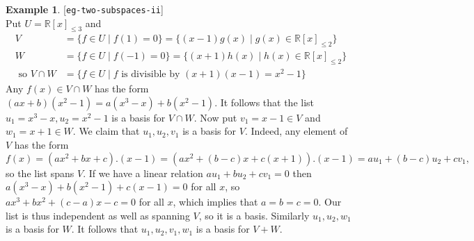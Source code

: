 \documentclass{amsart}
\newcommand{\lbl}[1]{\label{#1}\textup{[\texttt{#1}]}\ \\}
\newcommand{\lbl}{\label}
\newcommand{\R}         {{\mathbb{R}}}
\newcommand{\st}        {\;|\;}
\renewcommand{\:}       {\colon}
\theoremstyle{definition}
\newtheorem{example}[theorem]{Example}
\begin{document}
\begin{example}\lbl{eg-two-subspaces-ii}
 Put $U=\R[x]_{\leq 3}$ and 
 \begin{align*}
  V &= \{f\in U\st f(1)=0\} 
     = \{(x-1)g(x)\st g(x)\in \R[x]_{\leq 2}\} \\
  W &= \{f\in U\st f(-1)=0\} 
     = \{(x+1)h(x)\st h(x)\in \R[x]_{\leq 2}\} \\
  \text{ so } 
  V\cap W &=
    \{f\in U\st f \text{ is divisible by } (x+1)(x-1)=x^2-1\}
 \end{align*}
 Any $f(x)\in V\cap W$ has the form
 $(ax+b)(x^2-1)=a(x^3-x)+b(x^2-1)$.  It follows that the
 list $u_1=x^3-x,u_2=x^2-1$ is a basis for $V\cap W$.  Now
 put $v_1=x-1\in V$ and $w_1=x+1\in W$.  We claim that
 $u_1,u_2,v_1$ is a basis for $V$.  Indeed, any element of
 $V$ has the form 
 \[ f(x)=(ax^2+bx+c).(x-1) = (ax^2+(b-c)x+c(x+1)).(x-1) 
     = au_1 + (b-c)u_2 + cv_1,
 \]
 so the list spans $V$.  If we have a linear relation
 $au_1+bu_2+cv_1=0$ then $a(x^3-x)+b(x^2-1)+c(x-1)=0$ for
 all $x$, so $ax^3+bx^2+(c-a)x-c=0$ for all $x$, which
 implies that $a=b=c=0$.  Our list is thus independent as
 well as spanning $V$, so it is a basis.  Similarly
 $u_1,u_2,w_1$ is a basis for $W$.  It follows that
 $u_1,u_2,v_1,w_1$ is a basis for $V+W$. 
\end{example}
\end{document}
